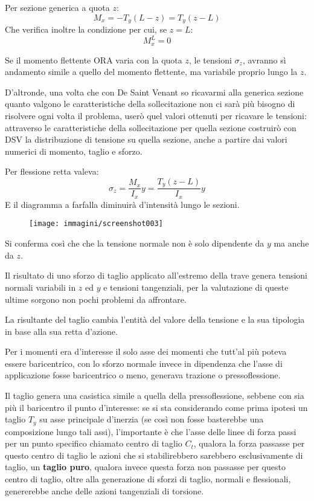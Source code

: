 \documentclass{article}
\begin{document}
\begin{adjustwidth}{2in}{}
		Per sezione generica a quota $z$: 
		\[M_x=-T_y(L-z) =T_y(z-L) \]
		Che verifica inoltre la condizione per cui, se $z=L$:
		\[M^L_x=0\]
		
		Se il momento flettente ORA varia con la quota $z$, le tensioni $\sigma_z$, avranno sì andamento simile a quello del momento flettente, ma variabile proprio lungo la $z$.
		
		D'altronde, una volta che con De Saint Venant so ricavarmi alla generica sezione quanto valgono le caratteristiche della sollecitazione non ci sarà più bisogno di risolvere ogni volta il problema, userò quel valori ottenuti per ricavare le tensioni: attraverso le caratteristiche della sollecitazione per quella sezione costruirò con DSV la distribuzione di tensione su quella sezione, anche a partire dai valori numerici di momento, taglio e sforzo.
		
		Per flessione retta valeva: 
		\[\sigma_z = \dfrac{M_x}{I_x}y = \dfrac{T_y(z-L)}{I_x}y\]
		E il diagramma a farfalla diminuirà d'intensità lungo le sezioni.

\begin{figure}[H]
	\centering
	\texttt{[image: immagini/screenshot003]}
	\label{fig:screenshot003}
\end{figure}

		Si conferma così che che la tensione normale non è solo dipendente da $y$ ma anche da $z$.\newline 
		
		Il risultato di uno sforzo di taglio applicato all'estremo della trave genera tensioni normali variabili in $z$ ed $y$ e tensioni tangenziali, per la valutazione di queste ultime sorgono non pochi problemi da affrontare. \newline 
		
		La risultante del taglio cambia l'entità del valore della tensione e la sua tipologia in base alla sua retta d'azione.
		
		Per i momenti era d'interesse il solo asse dei momenti che tutt'al più poteva essere baricentrico, con lo sforzo normale invece in dipendenza che l'asse di applicazione fosse baricentrico o meno, generava trazione o pressoflessione. 
		
		Il taglio genera una casistica simile a quella della pressoflessione, sebbene con sia più il baricentro il punto d'interesse: se si sta considerando come prima ipotesi un taglio $T_y$ su asse principale d'inerzia (se così non fosse basterebbe una composizione lungo tali assi), l'importante è che l'asse delle linee di forza passi per un punto specifico chiamato centro di taglio $C_t$, qualora la forza passasse per questo centro di taglio le azioni che si stabilirebbero sarebbero esclusivamente di taglio, un \textbf{taglio puro}, qualora invece questa forza non passasse per questo centro di taglio, oltre alla generazione di sforzi di taglio, normali e flessionali, genererebbe anche delle azioni tangenziali di torsione. \newline 
		

\end{adjustwidth}
\end{document}
